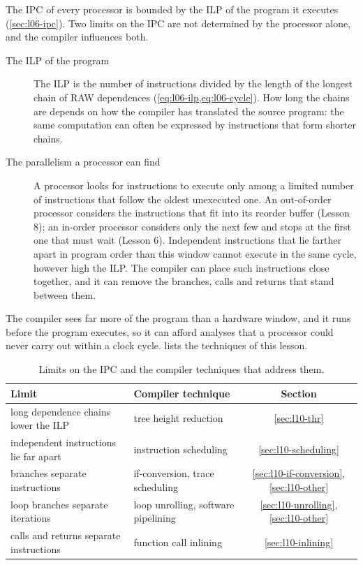 \documentclass[../main.tex]{subfiles}
\begin{document}
The IPC of every processor is bounded by the ILP of the program it executes
(\cref{sec:l06-ipc}).  Two limits
on the IPC are not determined by the processor alone, and the compiler
influences both.
\begin{description}
  \item[The ILP of the program] The ILP is the number of instructions divided
    by the length of the longest chain of RAW dependences
    (\cref{eq:l06-ilp,eq:l06-cycle}).  How long the chains are depends on how
    the compiler has translated the source program: the same computation can
    often be expressed by instructions that form shorter chains.
  \item[The parallelism a processor can find] A processor looks for
    instructions to execute only among a limited number of instructions that
    follow the oldest unexecuted one.  An out-of-order processor considers the
    instructions that fit into its reorder buffer (Lesson 8); an in-order
    processor considers only the next few and stops at the first one that must
    wait (Lesson 6).  Independent instructions that lie farther apart in
    program order than this window cannot execute in the same cycle, however
    high the ILP.  The compiler can place such instructions close together, and
    it can remove the branches, calls and returns that stand between them.
\end{description}
The compiler sees far more of the program than a hardware window, and it runs
before the program executes, so it can afford analyses that a processor could
never carry out within a clock cycle.   lists the
techniques of this lesson.

\begin{table}[htbp]
  \centering\small
  \caption{Limits on the IPC and the compiler techniques that address them.}
  \label{tab:l10-overview}
  \begin{tabular}{@{}llc@{}}
    \toprule
    Limit & Compiler technique & Section \\
    \midrule
    long dependence chains lower the ILP    & tree height reduction
      & \ref{sec:l10-thr} \\
    independent instructions lie far apart  & instruction scheduling
      & \ref{sec:l10-scheduling} \\
    branches separate instructions          & if-conversion, trace scheduling
      & \ref{sec:l10-if-conversion}, \ref{sec:l10-other} \\
    loop branches separate iterations       & loop unrolling, software pipelining
      & \ref{sec:l10-unrolling}, \ref{sec:l10-other} \\
    calls and returns separate instructions & function call inlining
      & \ref{sec:l10-inlining} \\
    \bottomrule
  \end{tabular}
\end{table}
\end{document}
